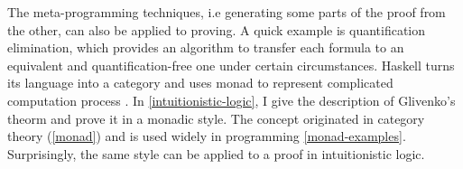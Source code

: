 The meta-programming techniques, i.e generating some parts of
the proof from the other, can also be applied to proving. A quick example
is quantification elimination, which provides an algorithm to transfer
each formula to an equivalent and quantification-free one under certain 
circumstances. Haskell turns its language into a category and uses monad 
to represent complicated computation process 
\cite{the-essence-of-functional-programming}. 
In \autoref{intuitionistic-logic}, I give the description of Glivenko's 
theorm and prove it in a monadic style. The concept originated 
in category theory (\autoref{monad}) and is used widely in programming 
\autoref{monad-examples}. Surprisingly, the same style can be applied to 
a proof in intuitionistic logic.
